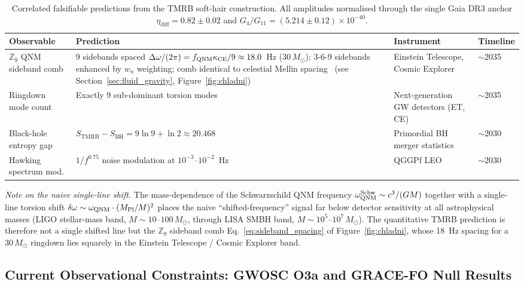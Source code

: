 \documentclass[11pt,a4paper]{article}
\begin{document}
\begin{table}[ht]
\centering
\caption{Correlated falsifiable predictions from the TMRB soft-hair construction.
All amplitudes normalised through the single Gaia DR3 anchor
$\eta_{\mathrm{diff}} = 0.82\pm0.02$ and $G_4/G_{11} = (5.214\pm0.12)\times10^{-40}$.}
\label{tab:predictions}
\begin{tabular}{p{3.2cm}p{5.2cm}p{3.4cm}l}
\toprule
Observable & Prediction & Instrument & Timeline \\
\midrule
$\mathbb{Z}_9$ QNM sideband comb
  & 9 sidebands spaced $\Delta\omega/(2\pi) = f_{\rm QNM}\kappa_{\rm CE}/9
    \approx 18.0$~Hz ($30\,M_\odot$); 3-6-9 sidebands enhanced by $w_n$
    weighting; comb identical to celestial Mellin
    spacing~\cite{BresslerCH2026,BresslerMellin2026}
    (see Section~\ref{sec:fluid_gravity}, Figure~\ref{fig:chladni})
  & Einstein Telescope, Cosmic Explorer
  & $\sim$2035 \\
Ringdown mode count
  & Exactly 9 sub-dominant torsion modes
  & Next-generation GW detectors (ET, CE)
  & $\sim$2035 \\
Black-hole entropy gap
  & $S_{\mathrm{TMRB}} - S_{\mathrm{BH}} = 9\ln 9 + \ln 2 \approx 20.468$
  & Primordial BH merger statistics
  & $\sim$2030 \\
Hawking spectrum mod.
  & $1/f^{0.75}$ noise modulation at $10^{-3}$--$10^{-2}$~Hz
  & QGGPf LEO \cite{BresslerQG2026}
  & $\sim$2030 \\
\bottomrule
\end{tabular}
\end{table}

\noindent\textit{Note on the naive single-line shift.}
The mass-dependence of the Schwarzschild QNM frequency
$\omega_{\rm QNM}^{\rm Schw} \sim c^3/(GM)$ together with a single-line torsion
shift $\delta\omega \sim \omega_{\rm QNM}\cdot(M_{\rm Pl}/M)^2$ places the naive
``shifted-frequency'' signal far below detector sensitivity at all astrophysical
masses (LIGO stellar-mass band, $M\sim 10$--$100\,M_\odot$, through LISA SMBH
band, $M\sim 10^5$--$10^7\,M_\odot$). The quantitative TMRB prediction is
therefore not a single shifted line but the $\mathbb{Z}_9$ sideband
comb Eq.~\eqref{eq:sideband_spacing} of Figure~\ref{fig:chladni}, whose 18~Hz
spacing for a $30\,M_\odot$ ringdown lies squarely in the Einstein
Telescope / Cosmic Explorer band.

\subsection{Current Observational Constraints: GWOSC O3a and GRACE-FO Null Results}
\label{sec:current_constraints}
\end{document}
